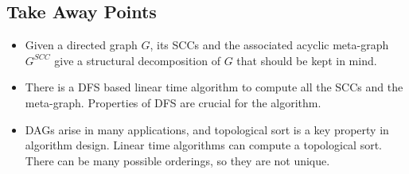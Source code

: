 \subsection{Take Away Points}
\begin{itemize}
    \item Given a directed graph $G$, its SCCs and the associated acyclic meta-graph $G^{SCC}$ give a structural decomposition of $G$ that should be kept in mind.
    \item There is a DFS based linear time algorithm to compute all the SCCs and the meta-graph. Properties of DFS are crucial for the algorithm.
    \item DAGs arise in many applications, and topological sort is a key property in algorithm design. Linear time algorithms can compute a topological sort. There can be many possible orderings, so they are not unique.
\end{itemize}
